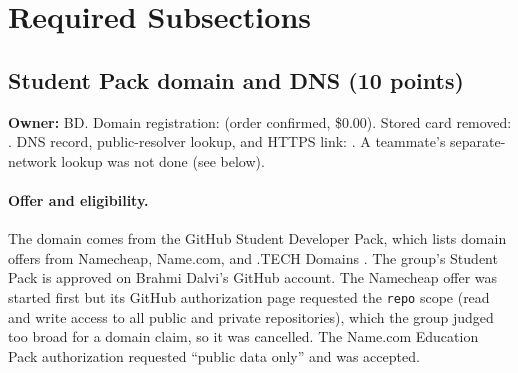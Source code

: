 \section{Required Subsections}
\subsection{Student Pack domain and DNS (10 points)}
\label{Section:giteaDomainDns}
\textbf{Owner:} BD. Domain registration: \StatusPass{} (order confirmed, \$0.00). Stored card removed: \StatusPass{}. DNS record, public-resolver lookup, and HTTPS link: \StatusPass{}. A teammate's separate-network lookup was not done (see below).

\paragraph{Offer and eligibility.}
The domain comes from the GitHub Student Developer Pack, which lists domain
offers from Namecheap, Name.com, and .TECH Domains \cite{GitHubPackDomains}.
The group's Student Pack is approved on Brahmi Dalvi's GitHub account. The
Namecheap offer was started first but its GitHub authorization page requested
the \texttt{repo} scope (read and write access to all public and private
repositories), which the group judged too broad for a domain claim, so it was
cancelled. The Name.com Education Pack authorization requested ``public data
only'' and was accepted.

